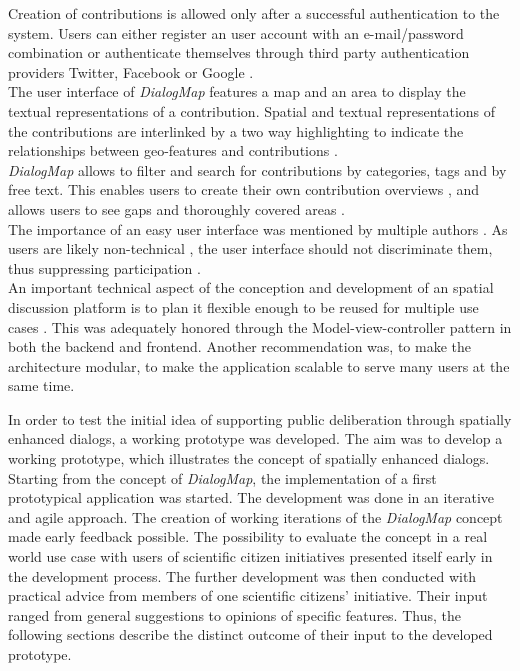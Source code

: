 Creation of contributions is allowed only after a successful authentication to the system. Users can either register an user account with an e-mail/password combination or authenticate themselves through third party authentication providers Twitter, Facebook or Google \cite{Sani2011_Scalable_Argumap,chun2014usability}.\\
The user interface of \textit{DialogMap} features a map and an area to display the textual representations of a contribution. Spatial and textual representations of the contributions are interlinked by a two way highlighting to indicate the relationships between geo-features and contributions \cite{Cai2009_spatial_annotation_deliberation,Sidlar2009-AssessmentMapGeocollaborationTool}.\\
\textit{DialogMap} allows to filter and search for contributions by categories, tags and by free text. This enables users to create their own contribution overviews \cite{Voss2004_Evolution_PGIS,you2009_participatory_map_based}, and allows users to see gaps and thoroughly covered areas \cite{Hopfer2007_Communication}.\\
The importance of an easy user interface was mentioned by multiple authors \cite{Rinner2009_Web2_argumap,Jankowski2005_community_based_pgis,Tang2005_PPGIS_discussion_forum,zhao2006geodf,you2009_participatory_map_based}. As users are likely non-technical \cite{Cai2009_spatial_annotation_deliberation}, the user interface should not discriminate them, thus suppressing participation \cite{Carver2001_PPGIS_Cyberdemocracy}.\\
An important technical aspect of the conception and development of an spatial discussion platform is to plan it flexible enough to be reused for multiple use cases \cite{Kessler2005_Conflict_Resolution,Kessler2005_ArgumentationMapPrototype,Sani2011_Scalable_Argumap}. This was adequately honored through the Model-view-controller pattern in both the backend and frontend. Another recommendation was, to make the architecture modular, to make the application scalable \cite{Sani2011_Scalable_Argumap} to serve many users at the same time.

In order to test the initial idea of supporting public deliberation through spatially enhanced dialogs, a working prototype was developed. The aim was to develop a working prototype, which illustrates the concept of spatially enhanced dialogs. Starting from the concept of \textit{DialogMap}, the implementation of a first prototypical application was started. The development was done in an iterative and agile approach. The creation of working iterations of the \textit{DialogMap} concept made early feedback possible. The possibility to evaluate the concept in a real world use case with users of scientific citizen initiatives presented itself early in the development process. The further development was then conducted with practical advice from members of one scientific citizens' initiative. Their input ranged from general suggestions to opinions of specific features. Thus, the following sections describe the distinct outcome of their input to the developed prototype.

